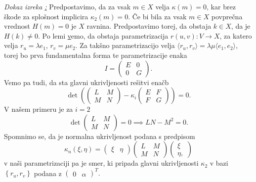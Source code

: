 \noindent
{\em Dokaz izreka \href{izr_plsokev_je_ploscata_ce_je_del_valja_ali_tangentnopremosnosne_ploskve}:\/}
Predpostavimo, da za vsak $m \in X$ velja $\kappa(m) = 0$, kar brez škode za splošnost implicira $\kappa_2(m) = 0$. Če bi bila za vsak $m \in X$ povprečna vrednost $H(m) = 0$ je $X$ ravnina. Predpostavimo torej, da obstaja
$k \in  X$, da je $H(k) \neq 0$.
Po lemi \href{lem_obstoj_funkcij} vemo, da obstaja parametrizacija $r(u,v): V \to X$, za katero velja $r_u = \lambda e_1$, $r_v = \mu e_2$. 
Za takšno parametrizacijo velja $\langle r_u, r_v \rangle = \lambda \mu \langle e_1, e_2 \rangle$, torej bo prva fundamentalna forma te parametrizacije enaka \begin{equation*}
I = \begin{pmatrix}
E & 0 \\
0 & G
\end{pmatrix}.
\end{equation*}  
Vemo pa tudi, da sta glavni ukrivljenosti rešitvi enačb \begin{equation*} \det \left( \begin{pmatrix}
  L & M \\
  M & N
  \end{pmatrix} - \kappa_i \begin{pmatrix}
  E & F \\
  F & G
  \end{pmatrix}  \right) = 0. \end{equation*}
V našem primeru je za $i = 2$ \begin{equation*}
  \det  \begin{pmatrix}
    L & M \\
    M & N
    \end{pmatrix} = 0 \implies LN - M^2 = 0.
\end{equation*}  
Spomnimo se, da je normalna ukrivljenost podana s predpisom \begin{equation*}
\kappa_n(\xi, \eta) = \begin{pmatrix}
    \xi & \eta
\end{pmatrix} \begin{pmatrix}
L & M \\
M & N
\end{pmatrix} \begin{pmatrix}
  \xi \\ \eta,
\end{pmatrix}
\end{equation*}  
v naši parametrizaciji pa je smer, ki pripada glavni ukrivljenosti $\kappa_2$ v bazi $\left\{ r_u, r_v\right\}$ podana z $\begin{pmatrix}
    0 & \alpha
\end{pmatrix}^{T}.$
